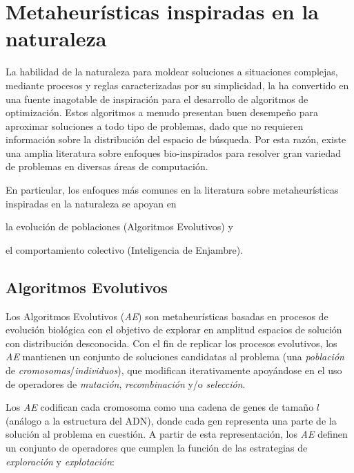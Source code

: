 \section{Metaheurísticas inspiradas en la naturaleza}

La habilidad de la naturaleza para moldear soluciones a situaciones complejas, mediante procesos y reglas caracterizadas por su simplicidad, la ha convertido en una fuente inagotable de inspiración para el desarrollo de algoritmos de optimización. Estos algoritmos a menudo presentan buen desempeño para aproximar soluciones a todo tipo de problemas, dado que no requieren información sobre la distribución del espacio de búsqueda. Por esta razón, existe una amplia literatura sobre enfoques bio-inspirados \cite{binitha2012survey} para resolver gran variedad de problemas en diversas áreas de computación.

En particular, los enfoques más comunes en la literatura sobre metaheurísticas inspiradas en la naturaleza se apoyan en
\begin{inparaenum}
\item la evolución de poblaciones (Algoritmos Evolutivos) y
\item el comportamiento colectivo (Inteligencia de Enjambre).
\end{inparaenum}

\subsection{Algoritmos Evolutivos}

Los Algoritmos Evolutivos (\emph{AE}) son metaheurísticas basadas en procesos de evolución biológica con el objetivo de explorar en amplitud espacios de solución con distribución desconocida. Con el fin de replicar los procesos evolutivos, los \emph{AE} mantienen un conjunto de soluciones candidatas al problema (una \emph{población} de \emph{cromosomas}/\emph{individuos}), que modifican iterativamente apoyándose en el uso de operadores de \emph{mutación}, \emph{recombinación} y/o \emph{selección}.

Los \emph{AE} codifican cada cromosoma como una cadena de genes de tamaño $l$ (análogo a la estructura del ADN), donde cada gen representa una parte de la solución al problema en cuestión. A partir de esta representación, los \emph{AE} definen un conjunto de operadores que cumplen la función de las estrategias de \emph{exploración} y \emph{explotación}:

